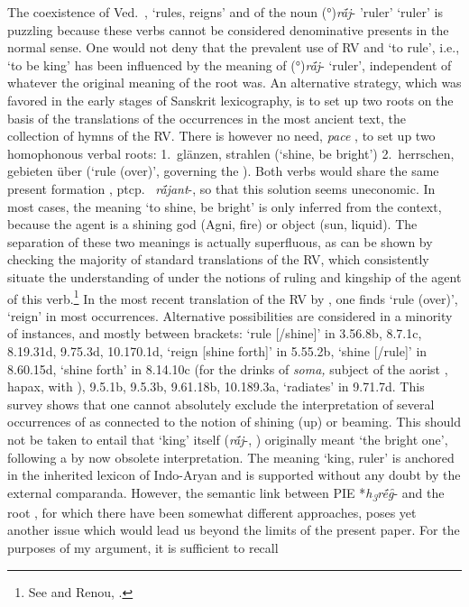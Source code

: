 \documentclass[output=paper,colorlinks,citecolor=brown]{langscibook}
\begin{document}
The coexistence of Ved.\  ,  ‘rules, reigns’ and of the noun (°)\textit{rā́j}-  'ruler' ‘ruler’ is  puzzling because these verbs cannot be considered denominative presents in the normal sense. One would not deny that the prevalent use of RV  and  ‘to rule’, i.e., `to be king’ has been influenced by the meaning of (°)\textit{rā́j}-  ‘ruler’, independent of whatever the original meaning of the root  was. An alternative strategy, which was favored in the early stages of Sanskrit lexicography, is to set up two roots on the basis of the translations of the occurrences in the most ancient text, the collection of hymns of the RV. There is however no need, \textit{pace} \citet[1156]{Grassmann}, to set up two homophonous verbal roots: 1.\ glänzen, strahlen (‘shine, be bright’) 2.\ herrschen, gebieten über (‘rule (over)’, governing the ).  Both verbs would share the same present formation \mbox{,} ptcp.\  \textit{rā́jant}-, so that this solution seems uneconomic. In most cases, the meaning ‘to shine, be bright’ is only inferred from the context, because the agent is a shining god (Agni, fire) or object (sun, liquid). The separation of these two meanings is actually superfluous, as can be shown by checking the majority of standard translations of the RV, which consistently situate the understanding of  under the notions of ruling and kingship of the agent of this verb.\footnote{See \citealt{GeldnerRV} and Renou, .}  In the most recent translation of the RV by \citet{JamisonBrereton2014}, one finds ‘rule (over)’, ‘reign’ in most occurrences. Alternative possibilities are considered in a minority of instances, and mostly between brackets: ‘rule [/shine]’ in 3.56.8b, 8.7.1c, 8.19.31d, 9.75.3d, 10.170.1d, ‘reign [shine forth]’ in 5.55.2b,  ‘shine [/rule]’ in 8.60.15d, ‘shine forth’ in 8.14.10c (for the drinks of \textit{soma,} subject of the aorist , hapax, with  ), 9.5.1b, 9.5.3b, 9.61.18b, 10.189.3a, ‘radiates’ in 9.71.7d. This survey shows that one cannot absolutely exclude the interpretation of several occurrences of  as connected to the notion of shining (up) or beaming. This should not be taken to entail that ‘king’ itself (\textit{rā́j}-,  ) originally meant ‘the bright one’, following a by now obsolete interpretation. The meaning ‘king, ruler’ is anchored in the inherited lexicon of Indo-Aryan and is supported without any doubt by the external comparanda. However, the semantic link between PIE *\textit{h\textsubscript{3}rḗg̑}- and the root , for which there have been somewhat different approaches, poses yet another issue which would lead us beyond the limits of the present paper. For the purposes of my argument, it is sufficient to recall 
\end{document}
